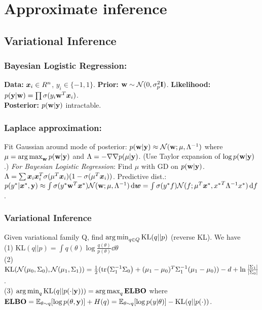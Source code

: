 
\section{Approximate inference}
\subsection{Variational Inference}
\subsubsection*{Bayesian Logistic Regression:}
\textbf{Data:} ${\bm{x}}_i \in R^n$, $y_i\in\{-1,1\}$.
\textbf{Prior:} ${\mathbf{w}}\sim\mathcal{N}(0,\sigma^2_p\mathbf{I})$.
\textbf{Likelihood:} $p({\mathbf{y}}|{\mathbf{w}}) = \prod\sigma(y_i{\mathbf{w}}^T{\bm{x}}_i)$.\\
\textbf{Posterior:} $p({\mathbf{w}}|{\mathbf{y}})$ intractable.
\subsubsection*{Laplace approximation:}
Fit Gaussian around mode of posterior: $p({\mathbf{w}}|{\mathbf{y}})\approx\mathcal{N}({\mathbf{w}};\mu,\Lambda^{-1})$ where $\mu = \operatorname*{arg\,max}_{\mathbf{w}}{p({\mathbf{w}}|{\mathbf{y}})}$ and $\Lambda = -\nabla\nabla p(\mu|{\mathbf{y}})$. (Use Taylor expansion of $\log p({\mathbf{w}}|{\mathbf{y}})$.)
\emph{For Bayesian Logistic Regression}: Find $\mu$ with GD on $p({\mathbf{w}}|{\mathbf{y}})$. $\Lambda = \sum {\bm{x}}_i{\bm{x}}_i^T\sigma(\mu^T {\bm{x}}_i)(1-\sigma(\mu^T {\bm{x}}_i))$. Predictive dist.: $p(y^*|{\bm{x}}^*,{\mathbf{y}}) \approx \int\sigma(y^*{\mathbf{w}}^T{\bm{x}}^*)\mathcal{N}({\mathbf{w}};\mu,\Lambda^{-1}) \dd{{\bm{w}}}   = \int\sigma(y^*f)\mathcal{N}(f;\mu^T{\bm{x}}^*, {x^*}^T\Lambda^{-1}x^*) \dd{f}$.
\subsubsection*{Variational Inference}
Given variational family Q, find $\operatorname*{arg\,min}_{q\in Q}\mathrm{KL}(q||p)$ (reverse KL). We have\\
(1) $\mathrm{KL}(q||p) = \int q(\theta)\log\frac{q(\theta)}{p(\theta)}\dd{\theta}$\\ 
(2) $\mathrm{KL}(\mathcal{N}(\mu_0,\Sigma_0),\mathcal{N}(\mu_1,\Sigma_1)) = \frac{1}{2}(\tr(\Sigma_1^{-1}\Sigma_0)+(\mu_1-\mu_0)^T\Sigma_1^{-1}(\mu_1-\mu_0))-d+\ln\frac{|\Sigma_1|}{|\Sigma_0|}$.\\
(3) $\operatorname*{arg\,min}_{q}\mathrm{KL}(q||p(\cdot|{\mathbf{y}}))) = \operatorname*{arg\,max}_q \mathrm{\color{black}\mathbf{ELBO}}$ where $\mathrm{\color{black}\mathbf{ELBO}} = \mathbb{E}_{\theta\sim q}[\log p(\theta, {\mathbf{y}})] + H(q) = \mathbb{E}_{\theta\sim q}[\log p(y|\theta)] - \mathrm{KL}(q||p(\cdot))$.

